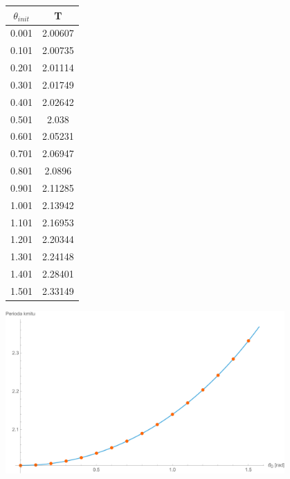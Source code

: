 \documentclass[reqno, a4paper]{amsart}
\begin{document}
\begin{minipage}{\textwidth}
\begin{minipage}[b]{0.2\textwidth}
\centering
\begin{tabular}{|c|c|}
\hline
$\theta_{init}$ & T \\ 
\hline
0.001& 2.00607\\0.101& 2.00735\\0.201& 2.01114\\0.301& 2.01749\\0.401& 2.02642\\0.501& 2.038\\0.601& 2.05231\\0.701& 2.06947\\0.801& 2.0896\\0.901& 2.11285\\1.001& 2.13942
\\1.101& 2.16953\\1.201& 2.20344\\1.301& 2.24148\\1.401& 2.28401\\1.501& 2.33149\\
\hline
\end{tabular}
\end{minipage}
\begin{minipage}[b]{0.79\textwidth}
\centering
\includegraphics[width=0.8\textwidth]{Runge - Kutta, Perioda}
\end{minipage}
\hfill
\end{minipage}

\clearpage
\end{document}
